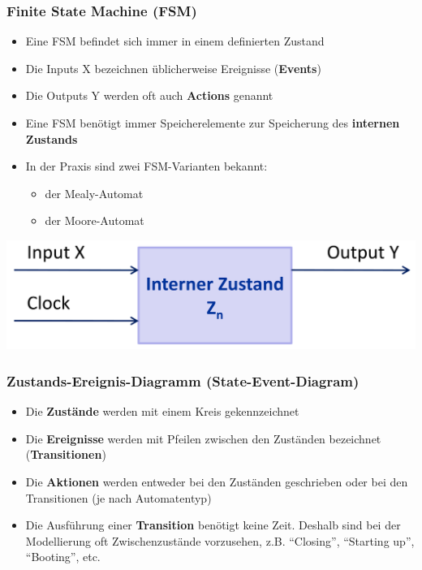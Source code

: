 \subsubsection{Finite State Machine (FSM)}
\begin{minipage}{0.7\linewidth}
\begin{itemize}
  \item Eine FSM befindet sich immer in einem definierten Zustand
  \item Die Inputs X bezeichnen üblicherweise Ereignisse (\textbf{Events})
  \item Die Outputs Y werden oft auch \textbf{Actions} genannt
  \item Eine FSM benötigt immer Speicherelemente zur Speicherung des \textbf{internen Zustands}
  \item In der Praxis sind zwei FSM-Varianten bekannt: \begin{itemize}
			\item der Mealy-Automat
			\item der Moore-Automat
  			\end{itemize}
\end{itemize}
\end{minipage}%
\begin{minipage}{0.3\linewidth}
\includegraphics[width=\linewidth]{./images/FSM/fsm}
\vfill\null
\end{minipage}

\subsubsection{Zustands-Ereignis-Diagramm (State-Event-Diagram)}
\begin{itemize}
  \item Die \textbf{Zustände} werden mit einem Kreis gekennzeichnet
  \item Die \textbf{Ereignisse} werden mit Pfeilen zwischen den Zuständen bezeichnet
  (\textbf{Transitionen})
  \item Die \textbf{Aktionen} werden entweder bei den Zuständen geschrieben oder bei den
  Transitionen (je nach Automatentyp)
  \item Die Ausführung einer \textbf{Transition} benötigt keine Zeit. Deshalb sind bei
  der Modellierung oft Zwischenzustände vorzusehen, z.B. "`Closing"', "`Starting
  up"', "`Booting"', etc.
\end{itemize}

